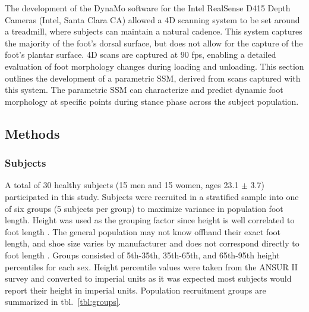 \documentclass[defaultstyle,11pt]{comps}
\begin{document}
The development of the DynaMo software \citep{Boppana2019} for the Intel RealSense D415 Depth Cameras (Intel, Santa Clara CA) allowed a 4D scanning system to be set around a treadmill, where subjects can maintain a natural cadence.
This system captures the majority of the foot's dorsal surface, but does not allow for the capture of the foot's plantar surface.
4D scans are captured at 90 fps, enabling a detailed evaluation of foot morphology changes during loading and unloading.
This section outlines the development of a parametric SSM, derived from scans captured with this system.
The parametric SSM can characterize and predict dynamic foot morphology at specific points during stance phase across the subject population.

\hypertarget{methods-2}{%
\subsection{Methods}\label{methods-2}}

\hypertarget{subjects}{%
\subsubsection{Subjects}\label{subjects}}

A total of 30 healthy subjects (15 men and 15 women, ages 23.1 \(\pm\) 3.7) participated in this study.
Subjects were recruited in a stratified sample into one of six groups (5 subjects per group) to maximize variance in population foot length.
Height was used as the grouping factor since height is well correlated to foot length \citep{Giles1991}. The general population may not know offhand their exact foot length, and shoe size varies by manufacturer and does not correspond directly to foot length \citep{Jurca2013, Wannop2019}. Groups consisted of 5th-35th, 35th-65th, and 65th-95th height percentiles for each sex.
Height percentile values were taken from the ANSUR II survey \citep{Gordon2014} and converted to imperial units as it was expected most subjects would report their height in imperial units.
Population recruitment groups are summarized in tbl.~\ref{tbl:groups}.
\end{document}

